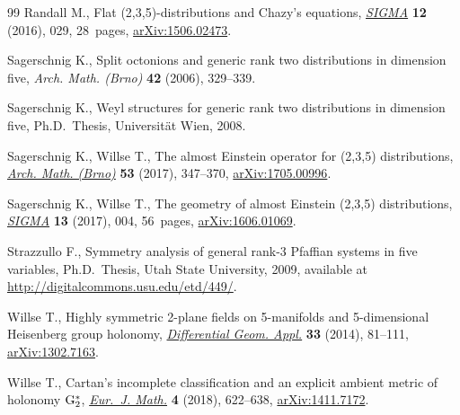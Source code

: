 \begin{thebibliography}{99}
Randall M., Flat (2,3,5)-distributions and {C}hazy's equations, \href{https://doi.org/10.3842/SIGMA.2016.029}{\textit{SIGMA}}
 \textbf{12} (2016), 029, 28~pages, \href{https://arxiv.org/abs/1506.02473}{arXiv:1506.02473}.

Sagerschnig K., Split octonions and generic rank two distributions in dimension
 five, \textit{Arch. Math. (Brno)} \textbf{42} (2006), 329--339.

Sagerschnig K., Weyl structures for generic rank two distributions in dimension
 five, Ph.D.~Thesis, {U}niversit\"at Wien, 2008.

Sagerschnig K., Willse T., The almost {E}instein operator for (2,3,5)
 distributions, \href{https://doi.org/10.5817/AM2017-5-347}{\textit{Arch. Math. (Brno)}} \textbf{53} (2017), 347--370,
 \href{https://arxiv.org/abs/1705.00996}{arXiv:1705.00996}.

Sagerschnig K., Willse T., The geometry of almost {E}instein (2,3,5)
 distributions, \href{https://doi.org/10.3842/SIGMA.2017.004}{\textit{SIGMA}} \textbf{13} (2017), 004, 56~pages,
 \href{https://arxiv.org/abs/1606.01069}{arXiv:1606.01069}.

Strazzullo F., Symmetry analysis of general rank-3 {P}faffian systems in five
 variables, Ph.D.~Thesis, {U}tah State University, 2009, available at
 \url{http://digitalcommons.usu.edu/etd/449/}.

Willse T., Highly symmetric 2-plane fields on 5-manifolds and 5-dimensional
 {H}eisenberg group holonomy, \href{https://doi.org/10.1016/j.difgeo.2013.10.010}{\textit{Differential Geom. Appl.}} \textbf{33}
 (2014), 81--111, \href{https://arxiv.org/abs/1302.7163}{arXiv:1302.7163}.

Willse T., Cartan's incomplete classification and an explicit ambient metric of
 holonomy {${\rm G}_2^*$}, \href{https://doi.org/10.1007/s40879-017-0178-9}{\textit{Eur.~J. Math.}} \textbf{4} (2018), 622--638,
 \href{https://arxiv.org/abs/1411.7172}{arXiv:1411.7172}.

\end{thebibliography}

